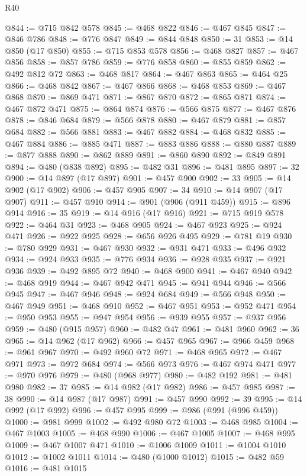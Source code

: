 \begin{lexlean}{R40}
\begin{coremodule}
{{{{{{{{{{{{{{{{{{{{{{{{{{{{{{{{{{{{{{{{{{{{{{{{{{{{{{{{{{{{{{{{{{{{{{{{{{{{{{{{{{{{{{{{{{{{{{{{{{{{{{{{{{{{{@844 := @715 @842 @578
@845 := @468 @822
@846 := @467 @845
@847 := @846 @786
@848 := @776 @847
@849 := @844 @848
@850 := 31
@853 := @14 @850 (@17 @850)
@855 := @715 @853 @578
@856 := @468 @827
@857 := @467 @856
@858 := @857 @786
@859 := @776 @858
@860 := @855 @859
@862 := @492 @812 @72
@863 := @468 @817
@864 := @467 @863
@865 := @464 @25
@866 := @468 @842
@867 := @467 @866
@868 := @468 @853
@869 := @467 @868
@870 := @869 @471
@871 := @867 @870
@872 := @865 @871
@874 := @467 @872 @471
@875 := @864 @874
@876 := @566 @875
@877 := @467 @876
@878 := @846 @684
@879 := @566 @878
@880 := @467 @879
@881 := @857 @684
@882 := @566 @881
@883 := @467 @882
@884 := @468 @832
@885 := @467 @884
@886 := @885 @471
@887 := @883 @886
@888 := @880 @887
@889 := @877 @888
@890 := @862 @889
@891 := @860 @890
@892 := @849 @891
@894 := @480 (@838 @892)
@895 := @482 @31
@896 := @481 @895
@897 := 32
@900 := @14 @897 (@17 @897)
@901 := @457 @900
@902 := 33
@905 := @14 @902 (@17 @902)
@906 := @457 @905
@907 := 34
@910 := @14 @907 (@17 @907)
@911 := @457 @910
@914 := @901 (@906 (@911 @459))
@915 := @896 @914
@916 := 35
@919 := @14 @916 (@17 @916)
@921 := @715 @919 @578
@922 := @464 @31
@923 := @468 @905
@924 := @467 @923
@925 := @924 @471
@926 := @922 @925
@928 := @656 @926 @495
@929 := @781 @19
@930 := @780 @929
@931 := @467 @930
@932 := @931 @471
@933 := @496 @932
@934 := @924 @933
@935 := @776 @934
@936 := @928 @935
@937 := @921 @936
@939 := @492 @895 @72
@940 := @468 @900
@941 := @467 @940
@942 := @468 @919
@944 := @467 @942 @471
@945 := @941 @944
@946 := @566 @945
@947 := @467 @946
@948 := @924 @684
@949 := @566 @948
@950 := @467 @949
@951 := @468 @910
@952 := @467 @951
@953 := @952 @471
@954 := @950 @953
@955 := @947 @954
@956 := @939 @955
@957 := @937 @956
@959 := @480 (@915 @957)
@960 := @482 @47
@961 := @481 @960
@962 := 36
@965 := @14 @962 (@17 @962)
@966 := @457 @965
@967 := @966 @459
@968 := @961 @967
@970 := @492 @960 @72
@971 := @468 @965
@972 := @467 @971
@973 := @972 @684
@974 := @566 @973
@976 := @467 @974 @471
@977 := @970 @976
@979 := @480 (@968 @977)
@980 := @482 @192
@981 := @481 @980
@982 := 37
@985 := @14 @982 (@17 @982)
@986 := @457 @985
@987 := 38
@990 := @14 @987 (@17 @987)
@991 := @457 @990
@992 := 39
@995 := @14 @992 (@17 @992)
@996 := @457 @995
@999 := @986 (@991 (@996 @459))
@1000 := @981 @999
@1002 := @492 @980 @72
@1003 := @468 @985
@1004 := @467 @1003
@1005 := @468 @990
@1006 := @467 @1005
@1007 := @468 @995
@1009 := @467 @1007 @471
@1010 := @1006 @1009
@1011 := @1004 @1010
@1012 := @1002 @1011
@1014 := @480 (@1000 @1012)
@1015 := @482 @59
@1016 := @481 @1015
}}}}}}}}}}}}}}}}}}}}}}}}}}}}}}}}}}}}}}}}}}}}}}}}}}}}}}}}}}}}}}}}}}}}}}}}}}}}}}}}}}}}}}}}}}}}}}}}}}}}}}}}}}}}}
\end{coremodule}
\end{lexlean}
